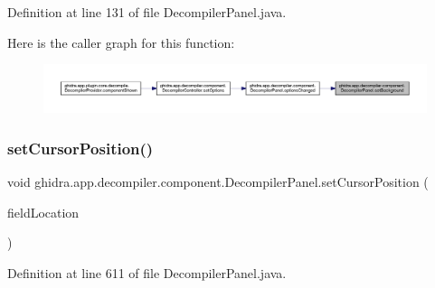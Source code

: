 Definition at line 131 of file Decompiler\+Panel.\+java.

Here is the caller graph for this function\+:
\nopagebreak
\begin{figure}[H]
\begin{center}
\leavevmode
\includegraphics[width=350pt]{classghidra_1_1app_1_1decompiler_1_1component_1_1_decompiler_panel_a0ed85871d15e3b2c6b9445b8736119fd_icgraph}
\end{center}
\end{figure}
\mbox{\label{classghidra_1_1app_1_1decompiler_1_1component_1_1_decompiler_panel_a5a0fe98890d4b8acb672196560f86459}} 
\subsubsection{\texorpdfstring{setCursorPosition()}{setCursorPosition()}}
{\footnotesize\ttfamily void ghidra.\+app.\+decompiler.\+component.\+Decompiler\+Panel.\+set\+Cursor\+Position (\begin{DoxyParamCaption}\item[{Field\+Location}]{field\+Location }\end{DoxyParamCaption})\hspace{0.3cm}{\ttfamily [inline]}}



Definition at line 611 of file Decompiler\+Panel.\+java.

